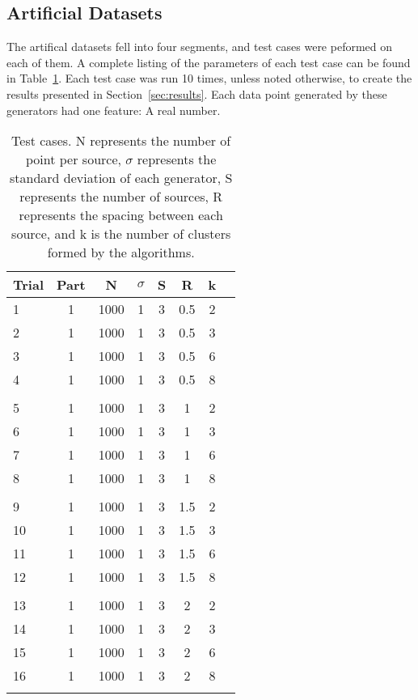 \documentclass{journal}
\begin{document}
\subsection{Artificial Datasets}
The artifical datasets fell into four segments, and test cases were peformed on
each of them. A complete listing of the parameters of each test case can be
found in Table~\ref{tab:tests}. Each test case was run 10 times, unless noted
otherwise, to create the results presented in Section~\ref{sec:results}. Each
data point generated by these generators had one feature: A real number.

\begin{table}[hp]
\centering{}
\caption{Test cases. N represents the number of point per source,
$\sigma{}$ represents the standard deviation of each generator, S represents
the number of sources, R represents the spacing between each source, and k
is the number of clusters formed by the algorithms.}\label{tab:tests}
\begin{tabular}{lccccccc}
    Trial & Part & N & $\sigma{}$ & S & R & k \\ \toprule
    1 & 1 & 1000 & 1 & 3 & 0.5 & 2 \\ %
    2 & 1 & 1000 & 1 & 3 & 0.5 & 3 \\
    3 & 1 & 1000 & 1 & 3 & 0.5 & 6 \\
    4 & 1 & 1000 & 1 & 3 & 0.5 & 8 \\ \\

    5 & 1 & 1000 & 1 & 3 & 1 & 2 \\ %
    6 & 1 & 1000 & 1 & 3 & 1 & 3 \\
    7 & 1 & 1000 & 1 & 3 & 1 & 6 \\
    8 & 1 & 1000 & 1 & 3 & 1 & 8 \\ \\

    9 & 1 & 1000 & 1 & 3 & 1.5 & 2 \\ %
    10 & 1 & 1000 & 1 & 3 & 1.5 & 3 \\
    11 & 1 & 1000 & 1 & 3 & 1.5 & 6 \\
    12 & 1 & 1000 & 1 & 3 & 1.5 & 8 \\ \\

    13 & 1 & 1000 & 1 & 3 & 2 & 2 \\ %
    14 & 1 & 1000 & 1 & 3 & 2 & 3 \\
    15 & 1 & 1000 & 1 & 3 & 2 & 6 \\
    16 & 1 & 1000 & 1 & 3 & 2 & 8 \\ \\


\end{tabular}
\end{table}
\end{document}

